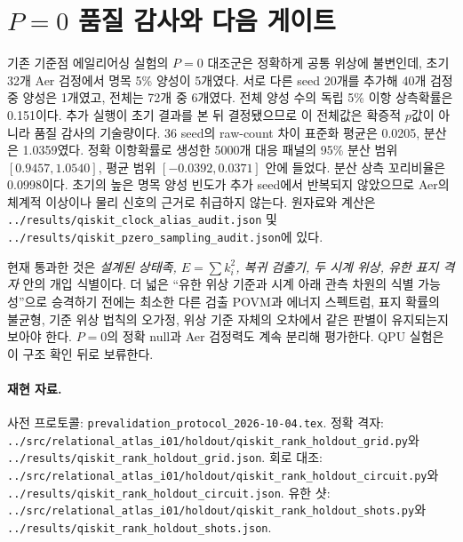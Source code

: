 \documentclass[11pt,a4paper]{article}
\begin{document}
\section{$P=0$ 품질 감사와 다음 게이트}
기존 기준점 에일리어싱 실험의 $P=0$ 대조군은 정확하게 공통 위상에
불변인데, 초기 32개 Aer 검정에서 명목 5\% 양성이 5개였다.
서로 다른 seed 20개를 추가해 40개 검정 중 양성은 1개였고,
전체는 72개 중 6개였다. 전체 양성 수의 독립 5\% 이항 상측확률은
0.151이다. 추가 실행이 초기 결과를 본 뒤 결정됐으므로 이 전체값은
확증적 $p$값이 아니라 품질 감사의 기술량이다.
36 seed의 raw-count 차이 표준화 평균은 0.0205, 분산은 1.0359였다.
정확 이항확률로 생성한 5000개 대응 패널의 95\% 분산 범위
$[0.9457,1.0540]$, 평균 범위 $[-0.0392,0.0371]$ 안에 들었다.
분산 상측 꼬리비율은 0.0998이다. 초기의 높은 명목 양성 빈도가
추가 seed에서 반복되지 않았으므로 Aer의 체계적 이상이나 물리 신호의
근거로 취급하지 않는다. 원자료와 계산은
\texttt{../results/qiskit\_clock\_alias\_audit.json} 및
\texttt{../results/qiskit\_pzero\_sampling\_audit.json}에 있다.

현재 통과한 것은 \emph{설계된 상태족, $E=\sum k_i^2$,
복귀 검출기, 두 시계 위상, 유한 표지 격자} 안의 개입 식별이다.
더 넓은 ``유한 위상 기준과 시계 아래 관측 차원의 식별 가능성''으로
승격하기 전에는 최소한 다른 검출 POVM과 에너지 스펙트럼,
표지 확률의 불균형, 기준 위상 법칙의 오가정, 위상 기준 자체의 오차에서
같은 판별이 유지되는지 보아야 한다. $P=0$의 정확 null과 Aer 검정력도
계속 분리해 평가한다. QPU 실험은 이 구조 확인 뒤로 보류한다.

\paragraph{재현 자료.}
사전 프로토콜: \texttt{prevalidation\_protocol\_2026-10-04.tex}.
정확 격자: \texttt{../src/relational\_atlas\_i01/holdout/qiskit\_rank\_holdout\_grid.py}와
\texttt{../results/qiskit\_rank\_holdout\_grid.json}.
회로 대조: \texttt{../src/relational\_atlas\_i01/holdout/qiskit\_rank\_holdout\_circuit.py}와
\texttt{../results/qiskit\_rank\_holdout\_circuit.json}.
유한 샷: \texttt{../src/relational\_atlas\_i01/holdout/qiskit\_rank\_holdout\_shots.py}와
\texttt{../results/qiskit\_rank\_holdout\_shots.json}.
\end{document}

